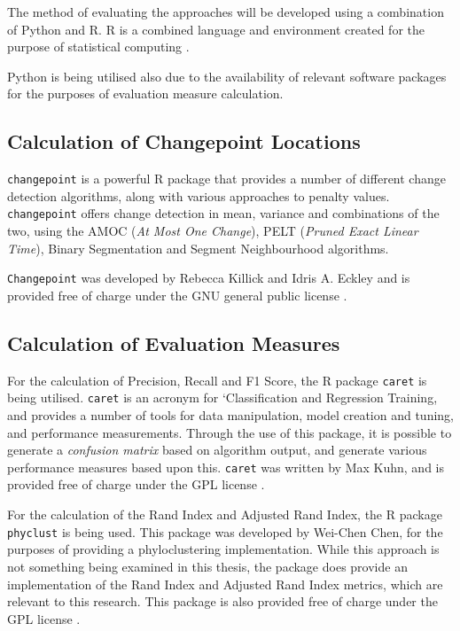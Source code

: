 \documentclass[../main.tex]{subfiles}
\begin{document}
The method of evaluating the approaches will be developed using a combination of Python and \textsf{R}. \textsf{R} is a combined language and environment created for the purpose of statistical computing \cite{RCoreTeam2017}.

Python is being utilised also due to the availability of relevant software packages for the purposes of evaluation measure calculation.

\subsection{Calculation of Changepoint Locations}

\texttt{changepoint} is a powerful R package that provides a number of different change detection algorithms, along with various approaches to penalty values. \texttt{changepoint} offers change detection in mean, variance and combinations of the two, using the AMOC (\emph{At Most One Change}), PELT (\emph{Pruned Exact Linear Time}), Binary Segmentation and Segment Neighbourhood algorithms.

\texttt{Changepoint} was developed by Rebecca Killick and Idris A. Eckley and is provided free of charge under the GNU general public license \cite{Killick2014}.

\subsection{Calculation of Evaluation Measures}

For the calculation of Precision, Recall and F1 Score, the \textsf{R} package \texttt{caret} is being utilised. \texttt{caret} is an acronym for `Classification and Regression Training, and provides a number of tools for data manipulation, model creation and tuning, and performance measurements. Through the use of this package, it is possible to generate a \emph{confusion matrix} based on algorithm output, and generate various performance measures based upon this. \texttt{caret} was written by Max Kuhn, and is provided free of charge under the GPL license \cite{FromJedWing2017}.

For the calculation of the Rand Index and Adjusted Rand Index, the \textsf{R} package \texttt{phyclust} is being used. This package was developed by Wei-Chen Chen, for the purposes of providing a phyloclustering implementation. While this approach is not something being examined in this thesis, the package does provide an implementation of the Rand Index and Adjusted Rand Index metrics, which are relevant to this research. This package is also provided free of charge under the GPL license \cite{Chen2011}.
\end{document}
